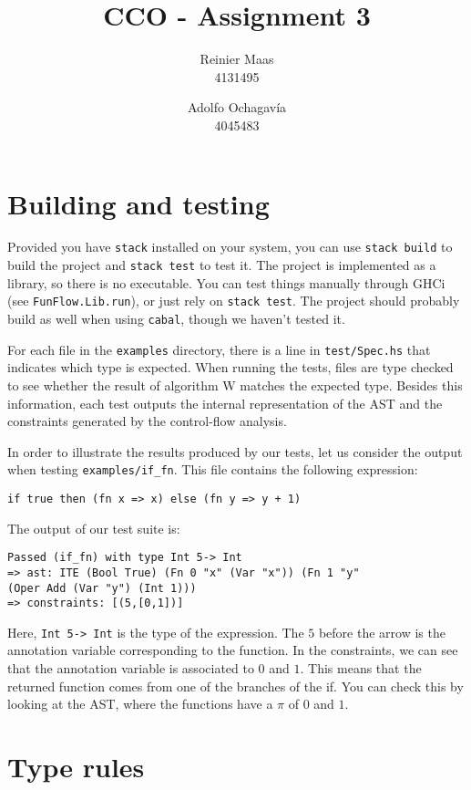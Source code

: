 \documentclass{article}
\author{
  Reinier Maas \\ 4131495
  \and
  Adolfo Ochagavía \\ 4045483
}
\title{CCO - Assignment 3}
\begin{document}
\maketitle

\section{Building and testing}

Provided you have \texttt{stack} installed on your system, you can use \texttt{stack build} to build the project and \texttt{stack test} to test it.
The project is implemented as a library, so there is no executable. You can test things manually through GHCi (see \texttt{FunFlow.Lib.run}), or just rely on \texttt{stack test}.
The project should probably build as well when using \texttt{cabal}, though we haven't tested it.

For each file in the \texttt{examples} directory, there is a line in \texttt{test/Spec.hs} that indicates which type is expected. When running the tests, files are type checked to see whether the result of algorithm W matches the expected type. Besides this information, each test outputs the internal representation of the AST and the constraints generated by the control-flow analysis.

In order to illustrate the results produced by our tests, let us consider the output when testing \texttt{examples/if\_fn}. This file contains the following expression:

\begin{verbatim}
if true then (fn x => x) else (fn y => y + 1)
\end{verbatim}

The output of our test suite is:

\begin{verbatim}
Passed (if_fn) with type Int 5-> Int
=> ast: ITE (Bool True) (Fn 0 "x" (Var "x")) (Fn 1 "y"
(Oper Add (Var "y") (Int 1)))
=> constraints: [(5,[0,1])]
\end{verbatim}

Here, \texttt{Int 5-> Int} is the type of the expression. The $5$ before the arrow is the annotation variable corresponding to the function. In the constraints, we can see that the annotation variable is associated to $0$ and $1$. This means that the returned function comes from one of the branches of the if. You can check this by looking at the AST, where the functions have a $\pi$ of $0$ and $1$.

\section{Type rules}
\end{document}
